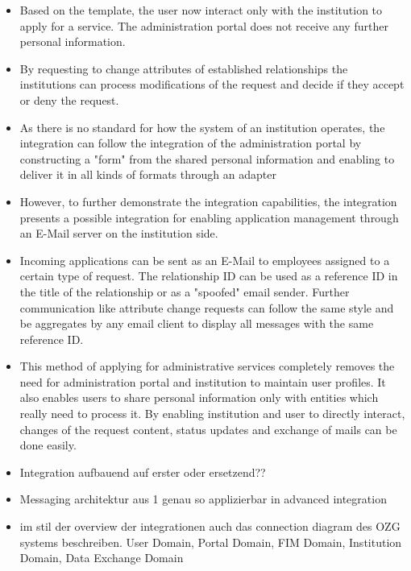 \begin{itemize}
    \item Based on the template, the user now interact only with the institution to apply for a service. The administration portal does not receive any further personal information.
    
    \item By requesting to change attributes of established relationships the institutions can process modifications of the request and decide if they accept or deny the request.
    
    \item As there is no standard for how the system of an institution operates, the integration can follow the integration of the administration portal by constructing a "form" from the shared personal information and enabling to deliver it in all kinds of formats through an adapter
    
    \item However, to further demonstrate the integration capabilities, the integration presents a possible integration for enabling application management through an E-Mail server on the institution side.
    
    \item Incoming applications can be sent as an E-Mail to employees assigned to a certain type of request. The relationship ID can be used as a reference ID in the title of the relationship or as a "spoofed" email sender. Further communication like attribute change requests can follow the same style and be aggregates by any email client to display all messages with the same reference ID.
    
    \item This method of applying for administrative services completely removes the need for administration portal and institution to maintain user profiles. It also enables users to share personal information only with entities which really need to process it. By enabling institution and user to directly interact, changes of the request content, status updates and exchange of mails can be done easily.
    
    \item Integration aufbauend auf erster oder ersetzend??
    
    \item Messaging architektur aus 1 genau so applizierbar in advanced integration
    
    \item im stil der overview der integrationen auch das connection diagram des OZG systems beschreiben. User Domain, Portal Domain, FIM Domain, Institution Domain, Data Exchange Domain
    

\end{itemize}
